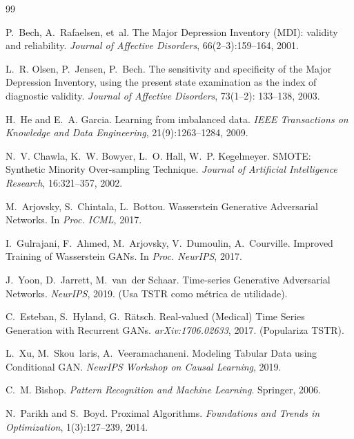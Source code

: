 \documentclass[12pt,a4paper]{report}
\begin{document}
\begin{thebibliography}{99}

P.~Bech, A.~Rafaelsen, et~al. \newblock The {M}ajor {D}epression {I}nventory ({MDI}): validity and reliability. \newblock \emph{Journal of Affective Disorders}, 66(2–3):159--164, 2001.

L.~R. Olsen, P.~Jensen, P.~Bech. \newblock The sensitivity and specificity of the {M}ajor {D}epression {I}nventory, using the present state examination as the index of diagnostic validity. \newblock \emph{Journal of Affective Disorders}, 73(1–2): 133--138, 2003.

H.~He and E.~A. Garcia. \newblock Learning from imbalanced data. \newblock \emph{IEEE Transactions on Knowledge and Data Engineering}, 21(9):1263--1284, 2009.

N.~V. Chawla, K.~W. Bowyer, L.~O. Hall, W.~P. Kegelmeyer. \newblock SMOTE: Synthetic Minority Over-sampling Technique. \newblock \emph{Journal of Artificial Intelligence Research}, 16:321--357, 2002.

M.~Arjovsky, S.~Chintala, L.~Bottou. \newblock Wasserstein Generative Adversarial Networks. \newblock In \emph{Proc. ICML}, 2017.

I.~Gulrajani, F.~Ahmed, M.~Arjovsky, V.~Dumoulin, A.~Courville. \newblock Improved Training of Wasserstein GANs. \newblock In \emph{Proc. NeurIPS}, 2017.

J.~Yoon, D.~Jarrett, M.~van~der Schaar. \newblock Time-series Generative Adversarial Networks. \newblock \emph{NeurIPS}, 2019. (Usa \textsc{TSTR} como métrica de utilidade).

C.~Esteban, S.~Hyland, G.~R\"atsch. \newblock Real-valued (Medical) Time Series Generation with Recurrent GANs. \newblock \emph{arXiv:1706.02633}, 2017. (Populariza \textsc{TSTR}).

L.~Xu, M.~Skou~laris, A.~Veeramachaneni. \newblock Modeling Tabular Data using Conditional GAN. \newblock \emph{NeurIPS Workshop on Causal Learning}, 2019.

C.~M. Bishop. \newblock \emph{Pattern Recognition and Machine Learning}. \newblock Springer, 2006.

N.~Parikh and S.~Boyd. \newblock Proximal Algorithms. \newblock \emph{Foundations and Trends in Optimization}, 1(3):127--239, 2014.


\end{thebibliography}
\end{document}
